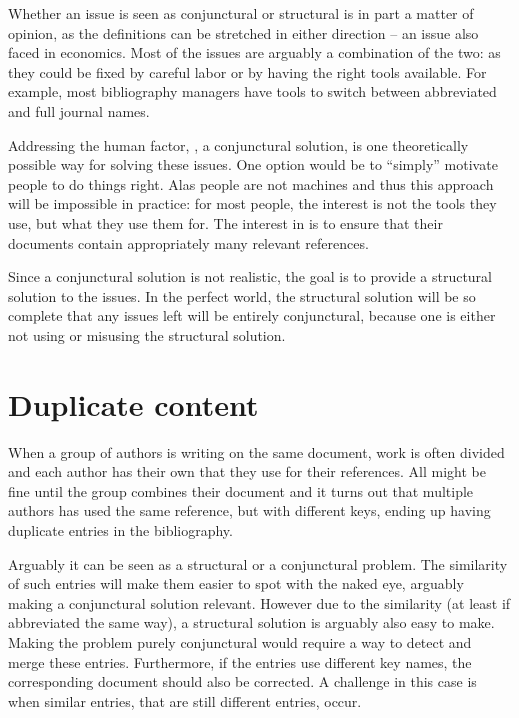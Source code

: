 Whether an issue is seen as conjunctural or structural is in part a
matter of opinion, as the definitions can be stretched in either
direction -- an issue also faced in economics.  Most of the issues are
arguably a combination of the two: as they could be fixed by careful
labor or by having the right tools available.  For example, most
bibliography managers have tools to switch between abbreviated and
full journal names.

Addressing the human factor, \ie, a conjunctural solution, is one
theoretically possible way for solving these issues.  One option would
be to ``simply'' motivate people to do things right.  Alas people are
not machines and thus this approach will be impossible in practice:
for most people, the interest is not the tools they use, but what they
use them for.  The interest in {\bibtex} is to ensure that their
documents contain appropriately many relevant references.

Since a conjunctural solution is not realistic, the goal is to provide
a structural solution to the issues.  In the perfect world, the
structural solution will be so complete that any issues left will be
entirely conjunctural, because one is either not using or misusing the
structural solution.


\section{Duplicate content}
\label{sec:problems_duplicates}

When a group of authors is writing on the same document, work is often
divided and each author has their own  that they use for
their references.  All might be fine until the group combines their
document and it turns out that multiple authors has used the same
reference, but with different keys, ending up having duplicate entries
in the bibliography.

Arguably it can be seen as a structural or a conjunctural problem.
The similarity of such entries will make them easier to spot with the
naked eye, arguably making a conjunctural solution relevant.  However
due to the similarity (at least if abbreviated the same way), a
structural solution is arguably also easy to make.  Making the problem
purely conjunctural would require a way to detect and merge these
entries.  Furthermore, if the entries use different key names, the
corresponding document should also be corrected. A challenge in this
case is when similar entries, that are still different entries, occur.

